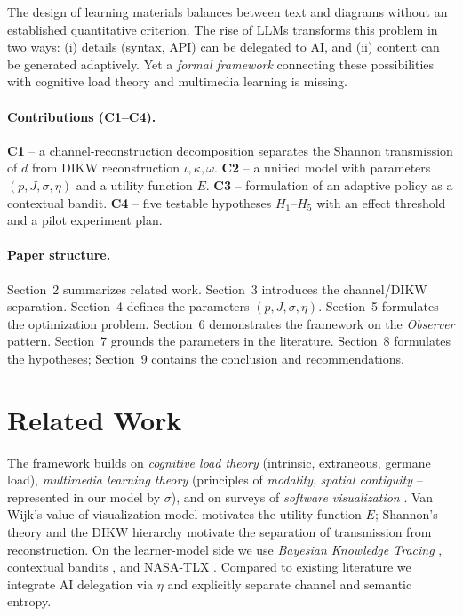 \documentclass[10pt,a4paper]{article}
\begin{document}
The design of learning materials balances between text and diagrams
without an established quantitative criterion. The rise of LLMs
transforms this problem in two ways: (i) details (syntax, API) can be
delegated to AI, and (ii) content can be generated adaptively. Yet a
\emph{formal framework} connecting these possibilities with cognitive
load theory \cite{sweller2019} and multimedia learning \cite{mayer2021}
is missing.

\paragraph{Contributions (C1--C4).}
\textbf{C1} – a channel-reconstruction decomposition separates the
Shannon transmission of $d$ from DIKW reconstruction
$\iota, \kappa, \omega$.
\textbf{C2} – a unified model with parameters $(p, J, \sigma, \eta)$
and a utility function $E$.
\textbf{C3} – formulation of an adaptive policy as a contextual bandit.
\textbf{C4} – five testable hypotheses $H_1$--$H_5$ with an effect
threshold and a pilot experiment plan.

\paragraph{Paper structure.} Section~2 summarizes related work.
Section~3 introduces the channel/DIKW separation. Section~4 defines
the parameters $(p, J, \sigma, \eta)$. Section~5 formulates the
optimization problem. Section~6 demonstrates the framework on the
\emph{Observer} pattern. Section~7 grounds the parameters in the
literature. Section~8 formulates the hypotheses; Section~9 contains
the conclusion and recommendations.

\section{Related Work}

The framework builds on \emph{cognitive load theory}
\cite{sweller1988,sweller2019} (intrinsic, extraneous, germane load),
\emph{multimedia learning theory} \cite{mayer2021} (principles of
\emph{modality}, \emph{spatial contiguity} – represented in our model
by $\sigma$), and on surveys of \emph{software visualization}
\cite{teyseyre2009,merino2018}. Van Wijk's value-of-visualization model
\cite{vanwijk2005} motivates the utility function $E$; Shannon's theory
\cite{shannon1948} and the DIKW hierarchy \cite{ackoff1989,rowley2007}
motivate the separation of transmission from reconstruction. On the
learner-model side we use \emph{Bayesian Knowledge Tracing}
\cite{corbett1995}, contextual bandits \cite{li2010}, and NASA-TLX
\cite{hart1988}. Compared to existing literature we integrate AI
delegation via $\eta$ and explicitly separate channel and semantic
entropy.
\end{document}
